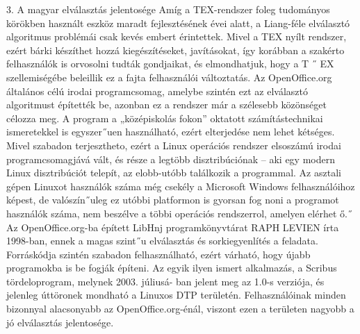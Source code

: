 \documentclass[11pt]{beamer}
\begin{document}
    \begin{frame}
        3. A magyar elválasztás jelentosége
        Amíg a TEX-rendszer foleg tudományos körökben használt eszköz maradt fejlesztésének
        évei alatt, a Liang-féle elválasztó algoritmus problémái csak kevés embert érintettek. Mivel a TEX nyílt rendszer, ezért bárki készíthet hozzá kiegészítéseket, javításokat, így korábban a szakérto felhasználók is orvosolni tudták gondjaikat, és elmondhatjuk, hogy a T ˝ EX
        szellemiségébe beleillik ez a fajta felhasználói változtatás.
        Az OpenOffice.org általános célú irodai programcsomag, amelybe szintén ezt az elválasztó algoritmust építették be, azonban ez a rendszer már a szélesebb közönséget célozza
        meg. A program a „középiskolás fokon” oktatott számítástechnikai ismeretekkel is egyszer˝uen használható, ezért elterjedése nem lehet kétséges. Mivel szabadon terjesztheto, ezért
        a Linux operációs rendszer elsoszámú irodai programcsomagjává vált, és része a legtöbb
        disztribúciónak – aki egy modern Linux disztribúciót telepít, az elobb-utóbb találkozik a
        programmal. Az asztali gépen Linuxot használók száma még csekély a Microsoft Windows felhasználóihoz képest, de valószín˝uleg ez utóbbi platformon is gyorsan fog noni a
        programot használók száma, nem beszélve a többi operációs rendszerrol, amelyen elérhet ő.˝
        Az OpenOffice.org-ba épített LibHnj programkönyvtárat RAPH LEVIEN írta 1998-ban,
        ennek a magas szint˝u elválasztás és sorkiegyenlítés a feladata. Forráskódja szintén szabadon felhasználható, ezért várható, hogy újabb programokba is be fogják építeni.
        Az egyik ilyen ismert alkalmazás, a Scribus tördeloprogram, melynek 2003. júliusá-
        ban jelent meg az 1.0-s verziója, és jelenleg úttöronek mondható a Linuxos DTP területén.
        Felhasználóinak minden bizonnyal alacsonyabb az OpenOffice.org-énál, viszont ezen a területen nagyobb a jó elválasztás jelentosége.
    \end{frame}
\end{document}
